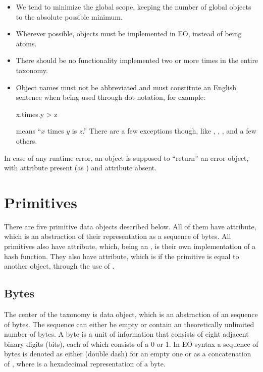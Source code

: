 \documentclass[sigplan,11pt,nonacm,natbib=false]{acmart}
\newcommand\aff[1]{\ff{\textcolor{gray}{$\star$}#1}}
\newcommand\deff[1]{\ff{\textcolor{blue!50!black}{\textbf{#1}}}}
\newcommand\adeff[1]{\aff{\textcolor{blue!50!black}{\textbf{#1}}}}
\newcommand\eohex[1]{\ff{#1}}
\begin{document}
\begin{itemize}
  \item We tend to minimize the global scope, keeping the number of global objects to the absolute possible minimum.
  \item Wherever possible, objects must be implemented in EO, instead of being atoms.
  \item There should be no functionality implemented two or more times in the entire taxonomy.
  \item Object names must not be abbreviated and must constitute an English sentence when being used through dot notation, for example:
\begin{ffcode}
x.times.y > z
\end{ffcode}
means ``$x$ times $y$ is $z$.''
There are a few exceptions though, like , , , and a few others.
\end{itemize}

In case of any runtime error, an object is supposed to ``return'' an error object, with  attribute present (as ) and  attribute absent.

\section{Primitives}\label{sec:primitives}

There are five primitive data objects described below. All of them have \adeff{as-bytes} attribute, which is an abstraction of their representation as a sequence of bytes.
All primitives also have \deff{as-hash} attribute, which, being an , is their own implementation of a hash function.
They also have \deff{eq} attribute, which is  if the primitive is equal to another object, through the use of .

\subsection{Bytes}

The center of the taxonomy is \deff{bytes} data object, which is an abstraction of an sequence of bytes. The sequence can either be empty or contain an theoretically unlimited number of bytes. A byte is a unit of information that consists of eight adjacent binary digits (bits), each of which consists of a 0 or 1. In EO syntax a sequence of bytes is denoted as either \eohex{--} (double dash) for an empty one or as a concatenation of \eohex{xx-}, where  is a hexadecimal representation of a byte.
\end{document}
